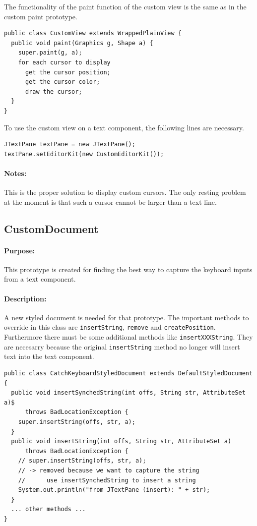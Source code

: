 \documentclass[11pt,a4paper]{article}
\begin{document}
The functionality of the paint function of the custom view is the same as in the custom paint prototype. 
\begin{verbatim}
public class CustomView extends WrappedPlainView {
  public void paint(Graphics g, Shape a) {
    super.paint(g, a);
    for each cursor to display
      get the cursor position;
      get the cursor color;
      draw the cursor;
  }
}
\end{verbatim}

To use the custom view on a text component, the following lines are necessary.
\begin{verbatim}
JTextPane textPane = new JTextPane();
textPane.setEditorKit(new CustomEditorKit());
\end{verbatim}

\paragraph{Notes:}
This is the proper solution to display custom cursors. The only resting problem at the moment is that such a cursor cannot be larger than a text line.




\subsection{CustomDocument}
\paragraph{Purpose:}
This prototype is created for finding the best way to capture the keyboard inputs from a text component.
\paragraph{Description:}
A new styled document is needed for that prototype. The important methods to override in this class are \texttt{insertString}, \texttt{remove} and \texttt{createPosition}. Furthermore there must be some additional methods like \texttt{insertXXXString}. They are necesarry because the original \texttt{insertString} method no longer will insert text into the text component.
\begin{verbatim}
public class CatchKeyboardStyledDocument extends DefaultStyledDocument {
  public void insertSynchedString(int offs, String str, AttributeSet a)$
      throws BadLocationException {
    super.insertString(offs, str, a);
  }
  public void insertString(int offs, String str, AttributeSet a)
      throws BadLocationException {
    // super.insertString(offs, str, a);
    // -> removed because we want to capture the string
    //      use insertSynchedString to insert a string
    System.out.println("from JTextPane (insert): " + str);
  }
  ... other methods ...
}\end{verbatim}
\end{document}
